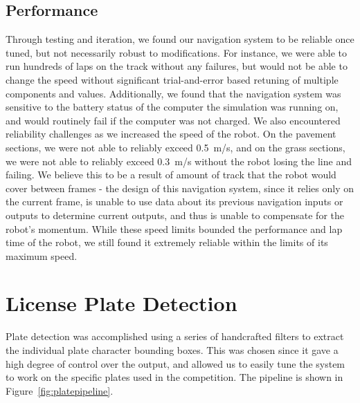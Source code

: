 \documentclass[titlepage, twocolumn]{article}
\begin{document}
    \subsection{Performance}
        Through testing and iteration, we found our navigation system to be reliable once tuned, but not necessarily robust to modifications. For instance, we were able to run hundreds of laps on the track without any failures, but would not be able to change the speed without significant trial-and-error based retuning of multiple components and values. Additionally, we found that the navigation system was sensitive to the battery status of the computer the simulation was running on, and would routinely fail if the computer was not charged. We also encountered reliability challenges as we increased the speed of the robot. On the pavement sections, we were not able to reliably exceed 0.5~m/s, and on the grass sections, we were not able to reliably exceed 0.3~m/s without the robot losing the line and failing. We believe this to be a result of amount of track that the robot would cover between frames - the design of this navigation system, since it relies only on the current frame, is unable to use data about its previous navigation inputs or outputs to determine current outputs, and thus is unable to compensate for the robot's momentum. While these speed limits bounded the performance and lap time of the robot, we still found it extremely reliable within the limits of its maximum speed.
    


    


\section{License Plate Detection}

Plate detection was accomplished using a series of handcrafted filters to extract the individual plate character bounding boxes. This was chosen since it gave a high degree of control over the output, and allowed us to easily tune the system to work on the specific plates used in the competition. The pipeline is shown in Figure~\ref{fig:platepipeline}.
\end{document}
